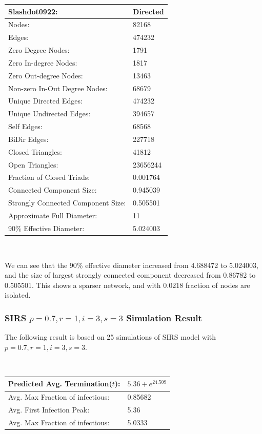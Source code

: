 \documentclass{subfile}
\begin{document}
  \begin{tabular}{|l|l|}
    \hline
    Slashdot0922: & Directed\\
    \hline
    Nodes: & 82168\\
    \hline
    Edges: & 474232\\
    \hline
    Zero Degree Nodes: & 1791\\
    \hline
    Zero In-degree Nodes: & 1817\\
    \hline
    Zero Out-degree Nodes: & 13463\\
    \hline
    Non-zero In-Out Degree Nodes: & 68679\\
    \hline
    Unique Directed Edges: & 474232\\
    \hline
    Unique Undirected Edges: & 394657\\
    \hline
    Self Edges: & 68568\\
    \hline
    BiDir Edges: & 227718\\
    \hline
    Closed Triangles: & 41812\\
    \hline
    Open Triangles: & 23656244\\
    \hline
    Fraction of Closed Triads: & 0.001764\\
    \hline
    Connected Component Size: & 0.945039\\
    \hline
    Strongly Connected Component Size: & 0.505501\\
    \hline
    Approximate Full Diameter: & 11\\
    \hline
    90\% Effective Diameter: & 5.024003\\
    \hline
  \end{tabular}

  ~

  We can see that the 90\% effective diameter increased from 4.688472 to 5.024003, and the size of largest strongly connected component decreased from 0.86782 to 0.505501. This shows a sparser network, and with 0.0218 fraction of nodes are isolated.

  \subsubsection{SIRS \(p=0.7, r=1, i=3, s=3\) Simulation Result}
  The following result is based on 25 simulations of SIRS model with \(p=0.7, r=1, i=3, s=3\).

  ~

  \begin{tabular}{|l|l|}
    \hline
    Predicted Avg. Termination(\(t\)): & \(5.36 + e^{24.509}\)\\
    \hline
    Avg. Max Fraction of infectious: & 0.85682\\
    \hline
    Avg. First Infection Peak: & 5.36\\
    \hline
    Avg. Max Fraction of infectious: & 5.0333\\
    \hline
  \end{tabular}
\end{document}
